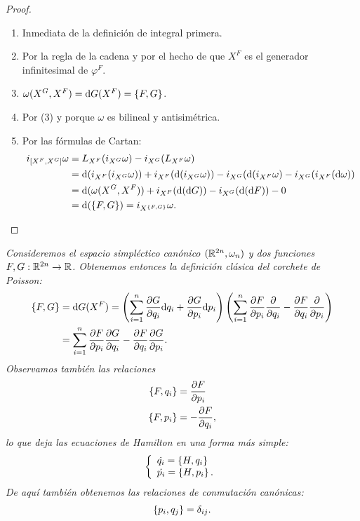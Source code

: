 \begin{proof}\leavevmode
  \begin{enumerate}
    \item Inmediata de la definición de integral primera.
    \item Por la regla de la cadena y por el hecho de que $X^ F$ es el generador infinitesimal de $\varphi^F$.
    \item $\omega(X^G,X^F)=\mathrm{d} G (X^F) = \left\lbrace F,G\right\rbrace$.
    \item Por (3) y porque $\omega$ es bilineal y antisimétrica.
    \item Por las fórmulas de Cartan:
      \begin{align*}
	i_{\left[X^F,X^G\right]} \omega & =  L_{X^F}(i_{X^G}\omega) - i_{X^G}(L_{X^F} \omega) \\ 
	& = \mathrm{d} (i_{X^F}(i_{X^G}\omega)) + i_{X^F}(\mathrm{d} (i_{X^G}\omega)) - i_{X^G}(\mathrm{d}(i_{X^F}\omega) - i_{X^G}(i_{X^F}(\mathrm{d} \omega)) \\
	& = \mathrm{d} (\omega(X^G,X^F)) + i_{X^F}(\mathrm{d}(\mathrm{d} G)) - i_{X^G}(\mathrm{d} (\mathrm{d} F)) - 0 \\
	& = \mathrm{d} (\left\lbrace F,G\right\rbrace) = i_{X^{\left\lbrace F,G\right\rbrace}}\omega.
      \end{align*}
  \end{enumerate}
\end{proof}

\begin{ejemplo}
  \em
  Consideremos el espacio simpléctico canónico $(\mathbb{R}^{2n},\omega_n)$ y dos funciones $F,G:\mathbb{R}^{2n} \rightarrow \mathbb{R}$. Obtenemos entonces la definición clásica del corchete de Poisson:
  \begin{align*}
    \left\lbrace F,G\right\rbrace & = \mathrm{d} G (X^F) = \left( \sum_{i=1}^n \frac{\partial G}{\partial q_i} \mathrm{d} q_i + \frac{\partial G}{\partial p_i} \mathrm{d} p_i \right) \left( \sum_{i=1}^n \frac{\partial F}{\partial p_i} \frac{\partial}{\partial q_i} - \frac{\partial F}{\partial q_i} \frac{\partial}{\partial p_i}\right) \\ 
    & =\sum_{i=1}^n \frac{\partial F}{\partial p_i} \frac{\partial G}{\partial q_i} - \frac{\partial F}{\partial q_i} \frac{\partial G}{\partial p_i}.
  \end{align*}
  Observamos también las relaciones
  \begin{align*}
    \left\lbrace F,q_i\right\rbrace &= \frac{\partial F}{\partial p_i} \\
    \left\lbrace F,p_i\right\rbrace &= -\frac{\partial F}{\partial q_i},
  \end{align*}
  lo que deja las ecuaciones de Hamilton en una forma más simple:
  \begin{equation*}
    \left\lbrace
    \begin{array}{l}
      \dot{q_i}=\left\lbrace H,q_i\right\rbrace \\
      \dot{p_i}=\left\lbrace H,p_i\right\rbrace.
    \end{array}
    \right.
  \end{equation*}
  De aquí también obtenemos las \emph{relaciones de conmutación canónicas}:
  \begin{equation*}
    \left\lbrace p_i,q_j\right\rbrace=\delta_{ij}.
  \end{equation*}
\end{ejemplo}

